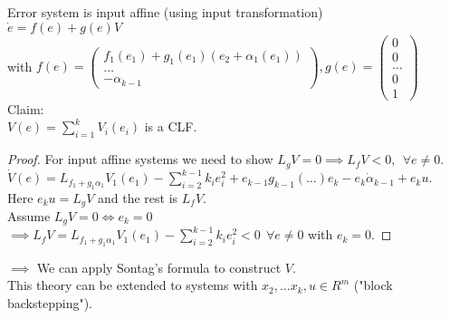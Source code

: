 Error system is input affine (using input transformation)\\
$\dot e = f(e)+g(e)V$\\
with $f(e) = \begin{pmatrix}
            f_1(e_1)+g_1(e_1)(e_2+\alpha_1(e_1)) \\
            \dots \\
            - \alpha_{k-1}
            \end{pmatrix}, 
    g(e) =\begin{pmatrix}
            0 \\
            0 \\
            \dots \\
            0 \\
            1
            \end{pmatrix}$\\

Claim:\\
$V(e) = \sum \limits_{i=1}^k V_i(e_i)$ is a CLF.
\begin{proof}
    For input affine systems we need to show $L_gV = 0 \implies L_fV < 0, \ \ \forall e \neq 0$.\\
    $\dot V(e) = L_{f_1+g_1\alpha_1}V_1(e_1) - \sum \limits_{i=2}^{k-1}k_ie_i^2 + e_{k-1}g_{k-1}(\dots)e_k - e_k \dot \alpha_{k-1} + e_ku.$\\
    Here $e_ku = L_gV$ and the rest is $L_fV$.\\
    Assume $L_gV = 0 \iff e_k = 0$\\
    $\implies L_fV = L_{f_1+g_1\alpha_1}V_1(e_1) - \sum \limits_{i=2}^{k-1}k_ie_i^2 < 0 \ \ \forall e \neq 0$ with $e_k = 0$.
\end{proof}

$\implies$ We can apply Sontag's formula to construct $V$.\\

This theory can be extended to systems with $x_2, \dots x_k,u \in R^m$ ("block backstepping").
